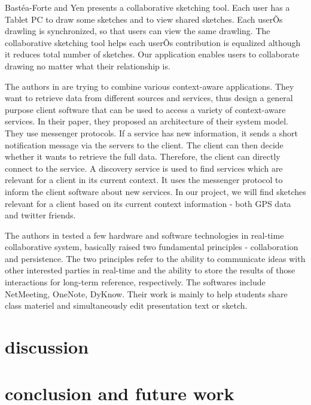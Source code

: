 \documentclass{chi2009}
\begin{document}
Bast\'{e}a-Forte and Yen \cite{brainstorming:marcello} presents a collaborative
sketching tool. Each user has a Tablet PC to draw some sketches and to view
shared sketches. Each userÕs drawling is synchronized, so that users can view
the same drawling. The collaborative sketching tool helps each userÕs
contribution is equalized although it reduces total number of sketches. Our
application enables users to collaborate drawing no matter what their
relationship is.

The authors in \cite{context:weis} are trying to combine various context-aware
applications. They want to retrieve data from different sources and services,
thus design a general purpose client software that can be used to access a
variety of context-aware services. In their paper, they proposed an
architecture of their system model. They use messenger protocols. If a service
has new information, it sends a short notification message via the servers to
the client. The client can then decide whether it wants to retrieve the full
data. Therefore, the client can directly connect to the service. A discovery
service is used to find services which are relevant for a client in its current
context. It uses the messenger protocol to inform the client software about new
services. In our project, we will find sketches relevant for a client based on
its current context information - both GPS data and twitter friends.

 The authors in \cite{ink:lindell} tested a few hardware and software
technologies in real-time collaborative system, basically raised two
fundamental principles - collaboration and persistence. The two principles
refer to the ability to communicate ideas with other interested parties in
real-time and the ability to store the results of those interactions for
long-term reference, respectively. The softwares include NetMeeting, OneNote,
DyKnow. Their work is mainly to help students share class materiel and
simultaneously edit presentation text or  sketch.

\section{discussion}

\section{conclusion and future work}




\end{document}
